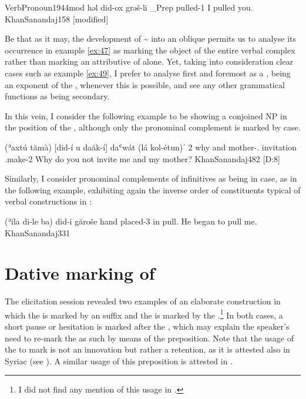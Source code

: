 \acex
{Verb}{Pronoun}{1944mod}
{həl\cb{} did-ox grəš-li\footnotemark}
{\acc\_Prep\cb{} \masc{} pulled-1\sg}
{I pulled you.}
{KhanSanandaj}{158 {[modified]}}


Be that as it may,  the development of \D\~ into an oblique  permits us to analyse its occurrence in example \ref{ex:47} as marking the object of the entire verbal complex  rather than marking an attributive \secn of  alone. Yet, taking into consideration clear cases such as example \ref{ex:49}, I prefer to analyse  first and foremost as a \gen* {}, being an exponent of the , whenever this is possible, and see any other grammatical functions as being secondary.

In this vein, I consider the following example to be showing a conjoined NP in the \secn position of the , although only the pronominal complement is marked by \gen* case. 


{(ʾaxtú tămà) [did-í \cb{}u daăk-í] daʿwát (lá kol-étun)ˈ}
{2\pl{} why \sg{} \cb{}and mother-\poss.\sg{} invitation \neg{} \ind.make-2\pl}
{Why do you not invite me and my mother?}
{KhanSanandaj}{482 {[D:8]}}

Similarly, I consider pronominal complements of infinitives as being in \gen* case, as in the following example, exhibiting again the inverse order of constituents typical of verbal constructions in \JSan:

{(ʾila di-le ba\cb{}) did-i găroše}
{hand placed-3\masc{} in\cb{} \sg{} pull.\inf}
{He began to pull me.}
{KhanSanandaj}{331}


\section{Dative marking of \secns} \label{ss:JSan_dat}

The elicitation session revealed two examples of an elaborate construction in which the \prim is marked by an \ez* suffix and the \secn is marked by the  .\footnote{I did not find any mention of this usage in \citet{KhanSanandaj}.} In both cases, a short pause or hesitation is marked after the \prim, which may explain the speaker's need to re-mark the \secn as such by means of the preposition. Note that the usage of the  to mark \secns is not an innovation but rather a retention, as it is attested also in Syriac (see ). A similar usage of this preposition is  attested in \NMand \citep[152]{HaberlMandaic}.

